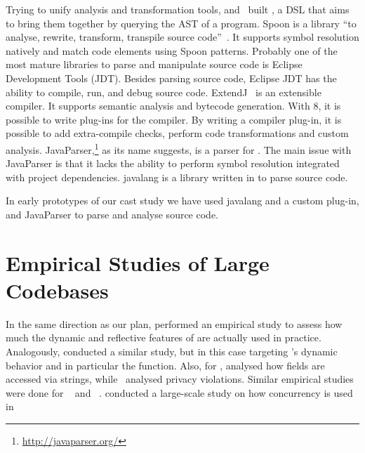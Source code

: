 Trying to unify analysis and transformation tools,
\cite{vinjuHowMakeBridge2006} and~\cite{klintRASCALDomainSpecific2009} built \rascal{},
a DSL that aims to bring them together by querying the AST of a program.
Spoon is a \java{} library
``to analyse, rewrite, transform, transpile \java{} source code''~\citep{pawlak:hal-01169705}.
It supports symbol resolution natively and match code elements using Spoon patterns.
Probably one of the most mature libraries to parse and manipulate \java{} source code is Eclipse \java{} Development Tools (JDT).%
Besides parsing \java{} source code,
Eclipse JDT has the ability to compile, run, and debug \java{} source code.
ExtendJ~\citep{Ekman:2007:JEJ:1297027.1297029} is an extensible \java{} compiler.
It supports semantic analysis and bytecode generation.
With \java{} 8, it is possible to write plug-ins for the \javac{} compiler.
By writing a compiler plug-in, it is possible to add extra-compile checks,
perform code transformations and custom analysis.
JavaParser,\footnote{\url{http://javaparser.org/}} as its name suggests,
is a parser for \java{}.
The main issue with JavaParser is that it lacks the ability to perform symbol resolution integrated with project dependencies.
javalang is a library written in \python{} to parse \java{} source code.

In early prototypes of our cast study we have used
javalang and a custom \javac{} plug-in,%
and JavaParser%
to parse and analyse \java{} source code.


\section{Empirical Studies of Large Codebases}
\label{sec:literature-review:largescale}

In the same direction as our plan,
\cite{callauHowWhyDevelopers2013} performed an empirical study to assess
how much the dynamic and reflective features of \smalltalk{} are actually
used in practice.
Analogously, \cite{richardsAnalysisDynamicBehavior2010,richardsEvalThatMen2011,weiEmpiricalStudyDynamic2016}
conducted a similar study, but in this case targeting \javascript's dynamic
behavior and in particular the  function.
Also, for \javascript{}, \cite{madsenStringAnalysisDynamic2014} analysed
how fields are accessed via strings,
while~\cite{jangEmpiricalStudyPrivacyviolating2010}
analysed privacy violations.
Similar empirical studies were done for
\php{}~\citep{hillsEmpiricalStudyPHP2013,dahseExperienceReportEmpirical2015,doyleEmpiricalStudyEvolution2011}
and \swift{}~\citep{reboucasEmpiricalStudyUsage2016}.
\cite{PINTO201559} conducted a large-scale study on how concurrency is used in \java{}


